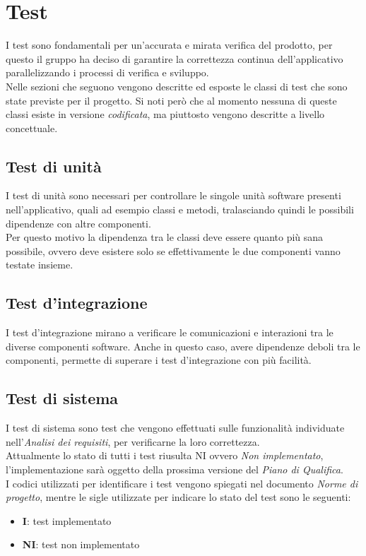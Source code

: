 \section{Test}
I test sono fondamentali per un'accurata e mirata verifica del prodotto, per questo il gruppo ha deciso di garantire la correttezza continua dell'applicativo parallelizzando i processi di verifica e sviluppo.\\
Nelle sezioni che seguono vengono descritte ed esposte le classi di test che sono state previste per il progetto. Si noti però che al momento nessuna di queste classi esiste in versione \textit{codificata}, ma piuttosto vengono descritte a livello concettuale.

\subsection{Test di unità}
I test di unità sono necessari per controllare le singole unità software presenti nell'applicativo, quali ad esempio classi e metodi, tralasciando quindi le possibili dipendenze con altre componenti.\\
Per questo motivo la dipendenza tra le classi deve essere quanto più sana possibile, ovvero deve esistere solo se effettivamente le due componenti vanno testate insieme.

\subsection{Test d'integrazione}
I test d'integrazione mirano a verificare le comunicazioni e interazioni tra le diverse componenti software. Anche in questo caso, avere dipendenze deboli tra le componenti, permette di superare i test d'integrazione con più facilità.

\subsection{Test di sistema}
I test di sistema sono test che vengono effettuati sulle funzionalità individuate nell'\textit{Analisi dei requisiti}, per verificarne la loro correttezza. \\
Attualmente lo stato di tutti i test riusulta NI ovvero \textit{Non implementato}, l'implementazione sarà oggetto della prossima versione del \textit{Piano di Qualifica}.\\
I codici utilizzati per identificare i test vengono spiegati nel documento \textit{Norme di progetto}, mentre le sigle utilizzate per indicare lo stato del test sono le seguenti: 
\begin{itemize}
    \item \textbf{I}: test implementato
    \item \textbf{NI}: test non implementato
\end{itemize}

